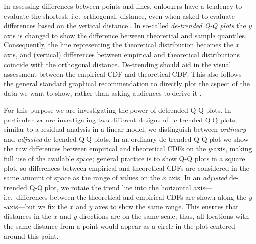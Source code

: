 \documentclass[12pt]{article}\usepackage[]{graphicx}\usepackage[]{color}
\begin{document}
In assessing differences between points and lines, onlookers have a tendency to evaluate the shortest, i.e.~orthogonal, distance, even when asked to evaluate differences based on the vertical distance \citep{sineillusion, robbins:2005, cleveland:1984}. 
In so-called {\it de-trended Q-Q plots} \citep[][p.~25--26]{thode:2002} the $y$ axis is changed to show the difference between theoretical and sample quantiles. 
Consequently, the line representing the theoretical distribution becomes the $x$ axis,
and (vertical) differences between empirical and theoretical distributions coincide with the orthogonal distance. 
De-trending should aid in the visual assessment between the empirical CDF and theoretical CDF. This also follows the general standard graphical recommendation to directly plot the aspect of the data we want to show, rather than asking audiences to derive it \citep{wainer:2000}.


For this purpose we are investigating the power of detrended Q-Q plots. In particular
 we are investigating two different designs of de-trended Q-Q plots; 
similar to a residual analysis in a linear model, we distinguish between {\it ordinary} and {\it adjusted} de-trended Q-Q plots. In an ordinary de-trended Q-Q plot we show the raw differences between empirical and theoretical CDFs on the $y$-axis, making full use of the available space; general practice is to show Q-Q plots in a square plot, so differences between empirical and theoretical CDFs are considered in  the same amount of space as the range of values on the $x$ axis. 
In an {\it adjusted} de-trended Q-Q plot, we rotate the trend line into the horizontal axis---i.e.\ differences between the theoretical and empirical CDFs are shown along the $y$-axis---but we fix the $x$ and $y$ axes to show the same range. This ensures that distances in the $x$ and $y$ directions are on the same scale; thus, all locations with the same distance from a point would appear as a circle in the plot centered around this point.  
\end{document}
